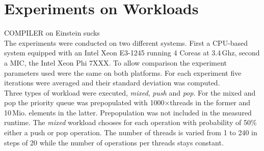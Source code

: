 

\section{Experiments on Workloads}
\label{sec:exp}
COMPILER on Einstein sucks\\
The experiments were conducted on two different systems. First a CPU-based system equipped with an Intel Xeon E3-1245 running 4 Coreas at 3.4\,Ghz, second a MIC, the Intel Xeon Phi 7XXX. To allow comparison the experiment parameters used were the same on both platforms. For each experiment five iterations were averaged and their standard deviation was computed.\\
Three types of workload were executed, \textit{mixed}, \textit{push} and \textit{pop}. For the mixed and pop the priority queue was prepopulated with 1000$\times$threads in the former and 10\,Mio. elements in the latter. Prepopulation was not included in the measured runtime. The \textit{mixed} workload chooses for each operation with probability of 50\% either a push or pop operation. The number of threads is varied from 1 to 240 in steps of 20 while the number of operations per threads stays constant.

